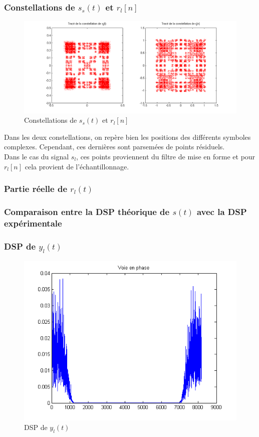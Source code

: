 \documentclass[11pt]{article}
\begin{document}
		\subsubsection{Constellations de $s_s(t)$ et $r_l[n]$}
			\begin{figure}[!h]
				\centering
				\includegraphics[scale=0.5]{images/Q426.png}
				\caption{Constellations de $s_s(t)$ et $r_l[n]$}
				\label{Q426}
			\end{figure}
			Dans les deux constellations, on repère bien les positions des différents symboles complexes. Cependant, ces dernières sont parsemées de points résiduels.\\
			Dans le cas du signal $s_l$, ces points proviennent du filtre de mise en forme et pour $r_l[n]$ cela provient de l'échantillonnage. 
			
		\subsubsection{Partie réelle de $r_l(t)$}
		
		
		\subsubsection{Comparaison entre la DSP théorique de $s(t)$ avec la DSP expérimentale}
		
		\subsubsection{DSP de $y_l(t)$}
			\begin{figure}[!h]
				\centering
				\includegraphics[scale=0.5]{images/Q4211.png}
				\caption{DSP de $y_l(t)$}
				\label{Q4211}
			\end{figure}
			
			
\end{document}

